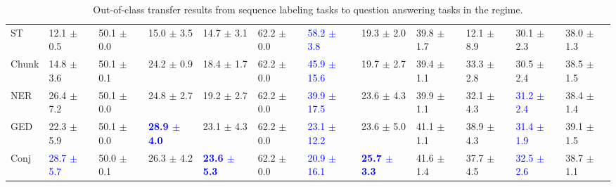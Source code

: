 \begin{landscape}
\begin{table}[t]
\begin{adjustbox}{max width=2\textwidth}
\begin{tabular}{ l l l l l  l l l l  l l l }
ST & 12.1 $\pm$ 0.5 & 50.1 $\pm$ 0.0 & 15.0 $\pm$ 3.5 & 14.7 $\pm$ 3.1 & 62.2 $\pm$ 0.0 & \textcolor{blue}{58.2 $\pm$ 3.8} & 19.3 $\pm$ 2.0 & 39.8 $\pm$ 1.7 & 12.1 $\pm$ 8.9 & 30.1 $\pm$ 2.3 & 38.0 $\pm$ 1.3\\
Chunk & 14.8 $\pm$ 3.6 & 50.1 $\pm$ 0.1 & 24.2 $\pm$ 0.9 & 18.4 $\pm$ 1.7 & 62.2 $\pm$ 0.0 & \textcolor{blue}{45.9 $\pm$ 15.6} & 19.7 $\pm$ 2.7 & 39.4 $\pm$ 1.1 & 33.3 $\pm$ 2.8 & 30.5 $\pm$ 2.4 & 38.5 $\pm$ 1.5\\
NER & 26.4 $\pm$ 7.2 & 50.1 $\pm$ 0.0 & 24.8 $\pm$ 2.7 & 19.2 $\pm$ 2.7 & 62.2 $\pm$ 0.0 & \textcolor{blue}{39.9 $\pm$ 17.5} & 23.6 $\pm$ 4.3 & 39.9 $\pm$ 1.1 & 32.1 $\pm$ 4.3 & \textcolor{blue}{31.2 $\pm$ 2.4} & 38.4 $\pm$ 1.4\\
GED & 22.3 $\pm$ 5.9 & 50.1 $\pm$ 0.0 & \textbf{\textcolor{blue}{28.9 $\pm$ 4.0}} & 23.1 $\pm$ 4.3 & 62.2 $\pm$ 0.0 & \textcolor{blue}{23.1 $\pm$ 12.2} & 23.6 $\pm$ 5.0 & 41.1 $\pm$ 1.1 & 38.9 $\pm$ 4.3 & \textcolor{blue}{31.4 $\pm$ 1.9} & 39.1 $\pm$ 1.5\\
Conj & \textcolor{blue}{28.7 $\pm$ 5.7} & 50.0 $\pm$ 0.1 & 26.3 $\pm$ 4.2 & \textbf{\textcolor{blue}{23.6 $\pm$ 5.3}} & 62.2 $\pm$ 0.0 & \textcolor{blue}{20.9 $\pm$ 16.1} & \textbf{\textcolor{blue}{25.7 $\pm$ 3.3}} & 41.6 $\pm$ 1.4 & 37.7 $\pm$ 4.5 & \textcolor{blue}{32.5 $\pm$ 2.6} & 38.7 $\pm$ 1.1\\
\bottomrule
\end{tabular}
\end{adjustbox}
\caption{Out-of-class transfer results from sequence labeling tasks to question answering tasks in the  regime.}
\label{tbla10c}
\end{table}
\end{landscape}